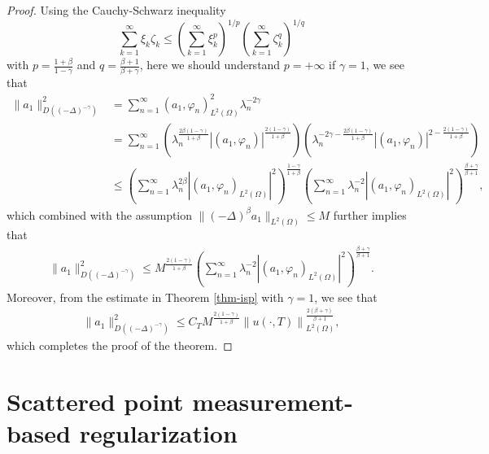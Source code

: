 \documentclass[11pt]{article}
\numberwithin{equation}{section}
\begin{document}
\begin{proof}
Using the Cauchy-Schwarz inequality
$$
\sum_{k=1}^\infty \xi_k \zeta_k \le  \left(\sum_{k=1}^\infty \xi_k^p \right)^{1/p} \left(\sum_{k=1}^\infty  \zeta_k^q\right)^{1/q}
$$
with $p=\frac{1+\beta}{1-\gamma}$ and $q=\frac{\beta+1}{\beta+\gamma}$, here we should understand $p=+\infty$ if $\gamma=1$, we see that
$$
\begin{aligned}
\|a_1\|_{D((-\Delta)^{-\gamma})}^2
&= \sum_{n=1}^\infty (a_1,\varphi_n )_{L^2(\Omega)}^2 \lambda_n^{-2\gamma} \\
&= \sum_{n=1}^\infty \left( \lambda_n^{\frac{2\beta(1-\gamma)}{1+\beta}} |(a_1,\varphi_n )|^{\frac{2(1-\gamma)}{1+\beta}} \right) \left( \lambda_n^{-2\gamma-\frac{2\beta(1-\gamma)}{1+\beta}} |(a_1,\varphi_n )|^{2 - \frac{2(1-\gamma)}{1+\beta}} \right)\\
&\le \left(\sum_{n=1}^\infty  \lambda_n^{2\beta} |(a_1,\varphi_n )_{L^2(\Omega)}|^{2} \right)^{\frac{1-\gamma}{1+\beta}} \left(\sum_{n=1}^\infty  \lambda_n^{-2} |(a_1,\varphi_n )_{L^2(\Omega)}|^{2} \right)^{\frac{\beta+\gamma}{\beta+1}} ,
\end{aligned}
$$
which combined with the assumption $\|(-\Delta)^{\beta} a_1\|_{L^2(\Omega)} \le M$ further implies that
$$
\begin{aligned}
\|a_1\|_{D((-\Delta)^{-\gamma})}^2
\le M^{\frac{2(1-\gamma)}{1+\beta}} \left(\sum_{n=1}^\infty  \lambda_n^{-2} |(a_1,\varphi_n )_{L^2(\Omega)}|^{2} \right)^{\frac{\beta+\gamma}{\beta+1}}.
\end{aligned}
$$
Moreover, from the estimate in Theorem \ref{thm-isp} with $\gamma=1$, we see that
$$
\begin{aligned}
\|a_1\|_{D((-\Delta)^{-\gamma})}^2
\le C_T M^{\frac{2(1-\gamma)}{1+\beta}} \left\| u(\cdot, T)\right\|_{L^2(\Omega)}^{\frac{2(\beta+\gamma)}{\beta+1}},
\end{aligned}
$$
which completes the proof of the theorem.
\end{proof}



\section{Scattered point measurement-based regularization}\label{sec-num}
\end{document}
